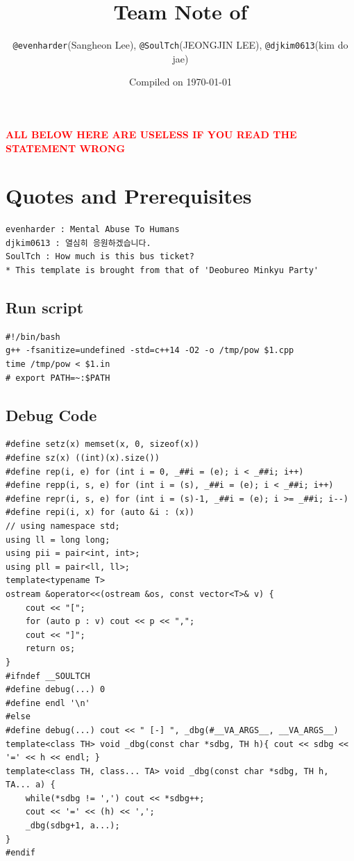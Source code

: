 \documentclass[landscape, 8pt, a4paper, oneside, twocolumn]{extarticle}
\title{Team Note of \texttt{\teamname}}
\author{\texttt{@evenharder}(Sangheon Lee), \texttt{@SoulTch}(JEONGJIN LEE), \texttt{@djkim0613}(kim do jae)}
\date{Compiled on \today}
\begin{document}
{
    \Large
    
    \maketitle
    \setcounter{tocdepth}{2}
    \tableofcontents
}
\thispagestyle{fancy}

\pagebreak

 \textcolor{red}{\textbf{ALL BELOW HERE ARE USELESS IF YOU READ THE STATEMENT WRONG}}
 

\setcounter{section}{-1}
\section{Quotes and Prerequisites}
\begin{verbatim}
evenharder : Mental Abuse To Humans
djkim0613 : 열심히 응원하겠습니다.
SoulTch : How much is this bus ticket?  
* This template is brought from that of 'Deobureo Minkyu Party'
\end{verbatim}
\subsection*{Run script}
\begin{verbatim}
#!/bin/bash
g++ -fsanitize=undefined -std=c++14 -O2 -o /tmp/pow $1.cpp
time /tmp/pow < $1.in
# export PATH=~:$PATH
\end{verbatim}

\subsection*{Debug Code}
\begin{verbatim}
#define setz(x) memset(x, 0, sizeof(x))
#define sz(x) ((int)(x).size())
#define rep(i, e) for (int i = 0, _##i = (e); i < _##i; i++)
#define repp(i, s, e) for (int i = (s), _##i = (e); i < _##i; i++)
#define repr(i, s, e) for (int i = (s)-1, _##i = (e); i >= _##i; i--)
#define repi(i, x) for (auto &i : (x))
// using namespace std;
using ll = long long;
using pii = pair<int, int>;
using pll = pair<ll, ll>;
template<typename T>
ostream &operator<<(ostream &os, const vector<T>& v) {
    cout << "[";
    for (auto p : v) cout << p << ",";
    cout << "]";
    return os;
}
#ifndef __SOULTCH
#define debug(...) 0
#define endl '\n'
#else
#define debug(...) cout << " [-] ", _dbg(#__VA_ARGS__, __VA_ARGS__)
template<class TH> void _dbg(const char *sdbg, TH h){ cout << sdbg << '=' << h << endl; }
template<class TH, class... TA> void _dbg(const char *sdbg, TH h, TA... a) {
    while(*sdbg != ',') cout << *sdbg++;
    cout << '=' << (h) << ','; 
    _dbg(sdbg+1, a...);
}
#endif
\end{verbatim}
\end{document}
